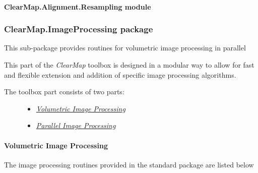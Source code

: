 \documentclass[letterpaper,10pt,english]{sphinxmanual}
\begin{document}
\paragraph{ClearMap.Alignment.Resampling module}
\label{api/ClearMap.Alignment:clearmap-alignment-resampling-module}

\subsubsection{ClearMap.ImageProcessing package}
\label{api/ClearMap.ImageProcessing:clearmap-imageprocessing-package}\label{api/ClearMap.ImageProcessing::doc}\label{api/ClearMap.ImageProcessing:module-ClearMap.ImageProcessing}
This sub-package provides routines for volumetric image processing in parallel

This part of the \emph{ClearMap} toolbox is designed in a modular way to allow for
fast and flexible extension and addition of specific image processing
algorithms.
\begin{description}
\item[{The toolbox part consists of two parts:}] \leavevmode\begin{itemize}
\item {} 
{\hyperref[api/ClearMap.ImageProcessing:volumetric-image-processing]{\emph{Volumetric Image Processing}}}

\item {} 
{\hyperref[api/ClearMap.ImageProcessing:parallel-image-processing]{\emph{Parallel Image Processing}}}

\end{itemize}

\end{description}


\paragraph{Volumetric Image Processing}
\label{api/ClearMap.ImageProcessing:volumetric-image-processing}
The image processing routines provided in the standard package are listed below
\end{document}
